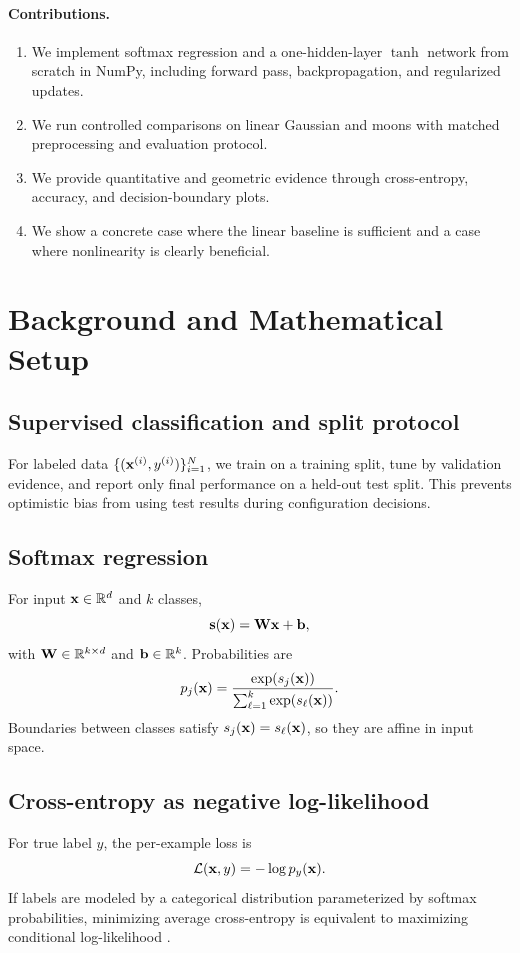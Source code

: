 \documentclass[sigconf,screen,nonacm]{acmart}
\begin{document}
\paragraph{Contributions.}
\begin{enumerate}[leftmargin=*,itemsep=0.25em]
    \item We implement softmax regression and a one-hidden-layer $\tanh$ network from scratch in NumPy, including forward pass, backpropagation, and regularized updates.
    \item We run controlled comparisons on linear Gaussian and moons with matched preprocessing and evaluation protocol.
    \item We provide quantitative and geometric evidence through cross-entropy, accuracy, and decision-boundary plots.
    \item We show a concrete case where the linear baseline is sufficient and a case where nonlinearity is clearly beneficial.
\end{enumerate}

\section{Background and Mathematical Setup}

\subsection{Supervised classification and split protocol}
For labeled data $\{(\mathbf{x}^{(i)},y^{(i)})\}_{i=1}^N$, we train on a training split, tune by validation evidence, and report only final performance on a held-out test split. This prevents optimistic bias from using test results during configuration decisions.

\subsection{Softmax regression}
For input $\mathbf{x} \in \mathbb{R}^d$ and $k$ classes,
\begin{equation}
    \mathbf{s}(\mathbf{x})=\mathbf{W}\mathbf{x}+\mathbf{b},
\end{equation}
with $\mathbf{W}\in\mathbb{R}^{k\times d}$ and $\mathbf{b}\in\mathbb{R}^k$. Probabilities are
\begin{equation}
    p_j(\mathbf{x})=\frac{\exp(s_j(\mathbf{x}))}{\sum_{\ell=1}^{k}\exp(s_\ell(\mathbf{x}))}.
\end{equation}
Boundaries between classes satisfy $s_j(\mathbf{x})=s_\ell(\mathbf{x})$, so they are affine in input space.

\subsection{Cross-entropy as negative log-likelihood}
For true label $y$, the per-example loss is
\begin{equation}
    \mathcal{L}(\mathbf{x},y)=-\log p_y(\mathbf{x}).
\end{equation}
If labels are modeled by a categorical distribution parameterized by softmax probabilities, minimizing average cross-entropy is equivalent to maximizing conditional log-likelihood \cite{murphy2022pml,cs229dlnotes}.
\end{document}
